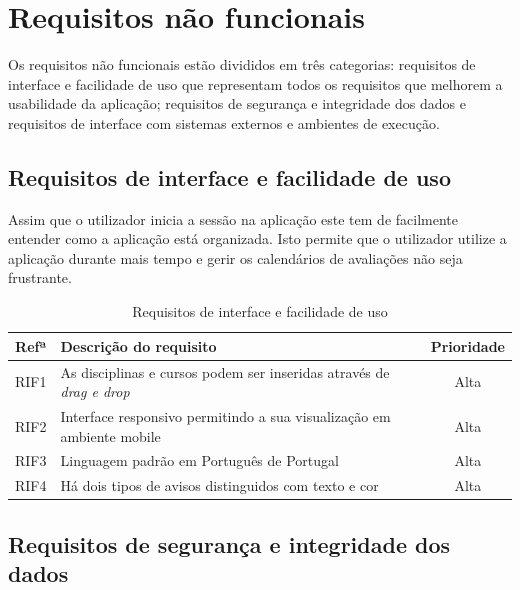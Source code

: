 \documentclass[12pt, twoside]{report}
\begin{document}
	
	\section{Requisitos não funcionais}
	
	Os requisitos não funcionais estão divididos em três categorias: requisitos de interface e facilidade de uso que representam todos os requisitos que melhorem a usabilidade da aplicação; requisitos de segurança e integridade dos dados e requisitos de interface com sistemas externos e ambientes de execução.
	
	\subsection{Requisitos de interface e facilidade de uso}

Assim que o utilizador inicia a sessão na aplicação este tem de facilmente entender como a aplicação está organizada.
Isto permite que o utilizador utilize a aplicação durante mais tempo e gerir os calendários de avaliações não seja frustrante.
	
	\begin{table}[H]
	\caption{Requisitos de interface e facilidade de uso}
	
	\begin{center}
		\begin{tabularx}{\textwidth}{|c|X|c|}
			\hline
			\textbf{Refª }	& \textbf{Descrição do requisito} & \textbf{Prioridade} \\
			\hline
			RIF1 & As disciplinas e cursos podem ser inseridas através de \textit{drag e drop} &Alta\\
			\hline
			RIF2 & Interface responsivo permitindo a sua visualização em ambiente mobile &Alta\\
			\hline
			RIF3 & Linguagem padrão em Português de Portugal &Alta\\
			\hline
			RIF4 & Há dois tipos de avisos distinguidos com texto e cor &Alta\\
			\hline
		\end{tabularx}
		\label{requisitosdeinterface}
	\end{center}
	\end{table}

	\subsection{Requisitos de segurança e integridade dos dados}
	
\end{document}
